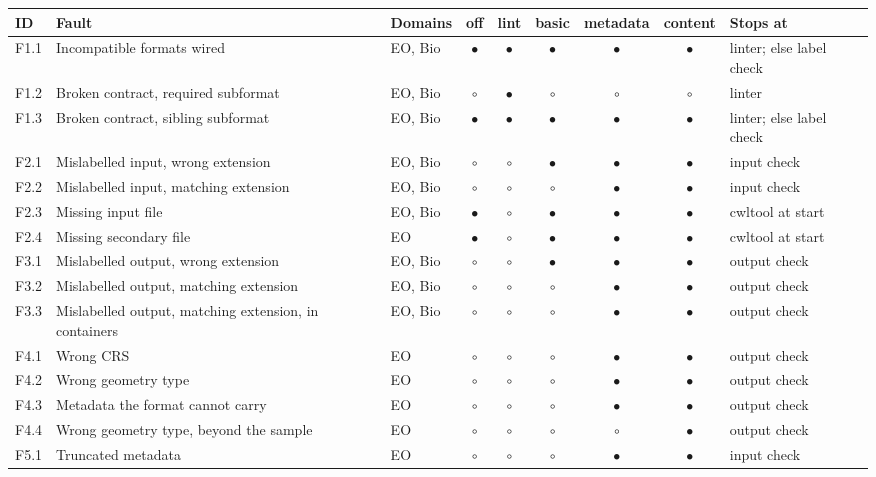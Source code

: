 \begin{tabular}{lllcccccl}
\toprule
ID & Fault & Domains & off & lint & basic & metadata & content & Stops at \\
\midrule
F1.1 & Incompatible formats wired & EO, Bio & $\bullet$ & $\bullet$ & $\bullet$ & $\bullet$ & $\bullet$ & linter; else label check \\
F1.2 & Broken contract, required subformat & EO, Bio & $\circ$ & $\bullet$ & $\circ$ & $\circ$ & $\circ$ & linter \\
F1.3 & Broken contract, sibling subformat & EO, Bio & $\bullet$ & $\bullet$ & $\bullet$ & $\bullet$ & $\bullet$ & linter; else label check \\
\midrule
F2.1 & Mislabelled input, wrong extension & EO, Bio & $\circ$ & $\circ$ & $\bullet$ & $\bullet$ & $\bullet$ & input check \\
F2.2 & Mislabelled input, matching extension & EO, Bio & $\circ$ & $\circ$ & $\circ$ & $\bullet$ & $\bullet$ & input check \\
F2.3 & Missing input file & EO, Bio & $\bullet$ & $\circ$ & $\bullet$ & $\bullet$ & $\bullet$ & cwltool at start \\
F2.4 & Missing secondary file & EO & $\bullet$ & $\circ$ & $\bullet$ & $\bullet$ & $\bullet$ & cwltool at start \\
\midrule
F3.1 & Mislabelled output, wrong extension & EO, Bio & $\circ$ & $\circ$ & $\bullet$ & $\bullet$ & $\bullet$ & output check \\
F3.2 & Mislabelled output, matching extension & EO, Bio & $\circ$ & $\circ$ & $\circ$ & $\bullet$ & $\bullet$ & output check \\
F3.3 & Mislabelled output, matching extension, in containers & EO, Bio & $\circ$ & $\circ$ & $\circ$ & $\bullet$ & $\bullet$ & output check \\
\midrule
F4.1 & Wrong CRS & EO & $\circ$ & $\circ$ & $\circ$ & $\bullet$ & $\bullet$ & output check \\
F4.2 & Wrong geometry type & EO & $\circ$ & $\circ$ & $\circ$ & $\bullet$ & $\bullet$ & output check \\
F4.3 & Metadata the format cannot carry & EO & $\circ$ & $\circ$ & $\circ$ & $\bullet$ & $\bullet$ & output check \\
F4.4 & Wrong geometry type, beyond the sample & EO & $\circ$ & $\circ$ & $\circ$ & $\circ$ & $\bullet$ & output check \\
\midrule
F5.1 & Truncated metadata & EO & $\circ$ & $\circ$ & $\circ$ & $\bullet$ & $\bullet$ & input check \\

\end{tabular}
